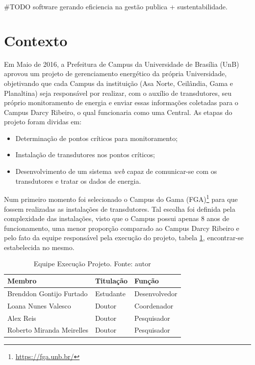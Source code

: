 \#TODO software gerando eficiencia na gestão publica + sustentabilidade.

\section{Contexto}
Em Maio de 2016, a Prefeitura de Campus da Universidade de Brasília (UnB) aprovou um projeto de gerenciamento energético da própria Universidade, objetivando que cada Campus da instituição (Asa Norte, Ceilândia, Gama e Planaltina) seja responsável por realizar, com o auxílio de transdutores, seu próprio monitoramento de energia e enviar essas informações coletadas para o Campus Darcy Ribeiro, o qual funcionaria como uma Central. As etapas do projeto foram dividas em:
\begin{itemize}
    \item Determinação de pontos críticos para monitoramento;
    \item Instalação de transdutores nos pontos críticos;
    \item Desenvolvimento de um sistema \textit{web} capaz de comunicar-se com os transdutores e tratar os dados de energia.
\end{itemize}

Num primeiro momento foi selecionado o Campus do Gama (FGA)\footnote{\url{https://fga.unb.br/}} para que
fossem realizadas as instalações de transdutores. Tal escolha foi definida pela complexidade das instalações, visto que o Campus possui apenas 8 anos de funcionamento, uma menor proporção comparado ao Campus Darcy Ribeiro e pelo fato da equipe responsável pela execução do projeto, tabela \ref{equipe_projeto}, encontrar-se estabelecida no mesmo.

\begin{table}[!htbp]
    \centering
    \caption{Equipe Execução Projeto. Fonte: autor}
    \label{equipe_projeto}
    \begin{tabular}{|p{5cm}|p{2cm}|p{3cm}|}
    \hline
    \textbf{Membro}                                                                    & \textbf{Titulação} & \textbf{Função}        \\\hline
    Brenddon Gontijo Furtado                                                  & Estudante & Desenvolvedor \\\hline
    Loana Nunes Valesco                                                       & Doutor    & Coordenador   \\\hline
    Alex Reis                                                                 & Doutor    & Pesquisador   \\\hline
    Roberto Miranda Meirelles                                                 & Doutor    & Pesquisador   \\\hline
    \end{tabular}
\end{table}

